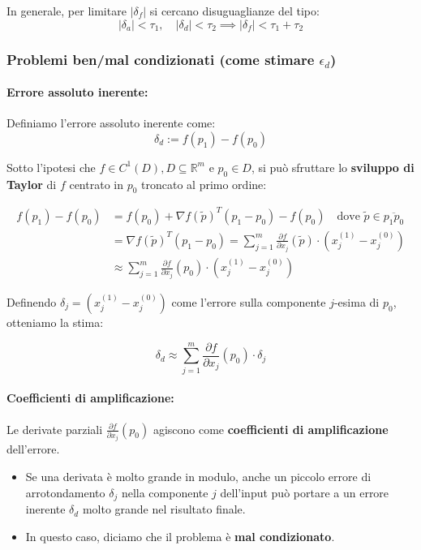 \documentclass[a4paper,12pt]{article}
\begin{document}
	In generale, per limitare $|\delta_f|$ si cercano disuguaglianze del tipo:
	\[ |\delta_a| < \tau_1, \quad |\delta_d| < \tau_2 \implies |\delta_f| < \tau_1 + \tau_2 \]
	\subsubsection{Problemi ben/mal condizionati (come stimare $\epsilon_d$)}
	
	\paragraph{Errore assoluto inerente:}
	Definiamo l'errore assoluto inerente come:
	\[ \delta_d := f(p_1) - f(p_0) \]
	
	Sotto l'ipotesi che $f \in C^1(D), D \subseteq \mathbb{R}^m$ e $p_0 \in D$, si può sfruttare lo \textbf{sviluppo di Taylor} di $f$ centrato in $p_0$ troncato al primo ordine:
	
	
	\begin{align*}
		f(p_1) - f(p_0) &= f(p_0) + \nabla f(\widetilde{p})^T (p_1 - p_0) - f(p_0) \quad \text{dove } \widetilde{p} \in \overline{p_1 p_0} \\
		&= \nabla f(\widetilde{p})^T (p_1 - p_0) = \sum_{j=1}^{m} \frac{\partial f}{\partial x_j}(\widetilde{p}) \cdot (x_j^{(1)} - x_j^{(0)}) \\
		&\approx \sum_{j=1}^{m} \frac{\partial f}{\partial x_j}(p_0) \cdot (x_j^{(1)} - x_j^{(0)})
	\end{align*}
	
	Definendo $\delta_j = (x_j^{(1)} - x_j^{(0)})$ come l'errore sulla componente $j$-esima di $p_0$, otteniamo la stima:
	
	\begin{tcolorbox}[colback=yellow!10!white, colframe=yellow!50!black]
		\[ \delta_d \approx \sum_{j=1}^{m} \frac{\partial f}{\partial x_j}(p_0) \cdot \delta_j \]
	\end{tcolorbox}
	
	\paragraph{Coefficienti di amplificazione:}
	Le derivate parziali $\frac{\partial f}{\partial x_j}(p_0)$ agiscono come \textbf{coefficienti di amplificazione} dell'errore. 
	
	\begin{itemize}
		\item Se una derivata è molto grande in modulo, anche un piccolo errore di arrotondamento $\delta_j$ nella componente $j$ dell'input può portare a un errore inerente $\delta_d$ molto grande nel risultato finale.
		\item In questo caso, diciamo che il problema è \textbf{mal condizionato}.
	\end{itemize}
\end{document}
